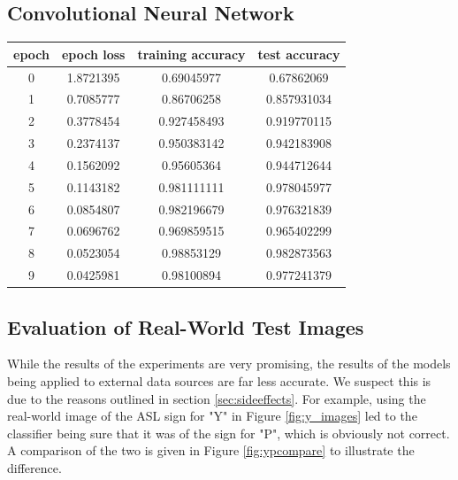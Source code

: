 \documentclass[10pt,Times New Roman]{article}
\begin{document}
    \subsection{Convolutional Neural Network}
    \begin{center}
    \begin{tabular}{|c|c|c|c|}
        \hline
        epoch&        epoch loss&        training accuracy&        test accuracy\\
        \hline
        0&        1.8721395&        0.69045977&        0.67862069\\
        \hline
        1&        0.7085777&        0.86706258&        0.857931034\\
        \hline
        2&        0.3778454&        0.927458493&        0.919770115\\
        \hline
        3&        0.2374137&        0.950383142&        0.942183908\\
        \hline
        4&        0.1562092&        0.95605364&        0.944712644\\
        \hline
        5&        0.1143182&        0.981111111&        0.978045977\\
        \hline
        6&        0.0854807&        0.982196679&        0.976321839\\
        \hline
        7&        0.0696762&        0.969859515&        0.965402299\\
        \hline
        8&        0.0523054&        0.98853129&        0.982873563\\
        \hline
        9&        0.0425981&        0.98100894&        0.977241379\\
        \hline
    \end{tabular}
    \end{center}


    \subsection{Evaluation of Real-World Test Images}
        While the results of the experiments are very promising, the results of the models
        being applied to external data sources are far less accurate. We suspect this is due
        to the reasons outlined in section \ref{sec:sideeffects}. For example, using the
        real-world image of the ASL sign for "Y" in Figure \ref{fig:y_images} led to the classifier
        being sure that it was of the sign for "P", which is obviously not correct. A comparison
        of the two is given in Figure \ref{fig:ypcompare} to illustrate the difference.
\end{document}
